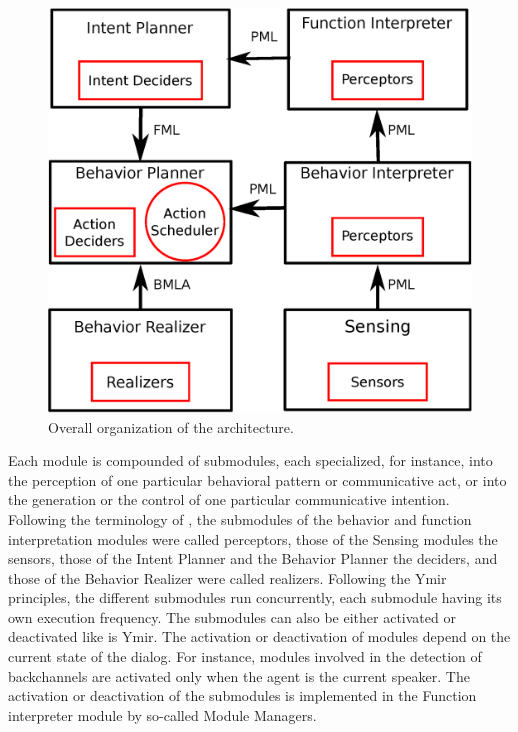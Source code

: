\begin{figure}
  \centering
  \includegraphics[width=\linewidth]{figure/impl_schema.eps}
  \caption{Overall organization of the architecture.}
  \label{overall_archi}
\end{figure}

Each module is compounded of submodules, each specialized, for instance, into the perception of one particular behavioral pattern or communicative act, or into the generation or the control of one particular communicative intention. Following the terminology of \cite{thorisson_mind_1999}, the submodules of the behavior and function interpretation modules were called perceptors, those of the Sensing modules the sensors, those of the Intent Planner and the Behavior Planner the deciders, and those of the Behavior Realizer were called realizers. 
Following the Ymir principles, the different submodules run concurrently, each submodule having its own execution frequency. 
The submodules can also be either activated or deactivated like is Ymir.
The activation or deactivation of modules depend on the current state of the dialog. 
For instance, modules involved in the detection of backchannels are activated only when the agent is the current speaker. 
The activation or deactivation of the submodules is implemented in the Function interpreter module by so-called Module Managers. 


